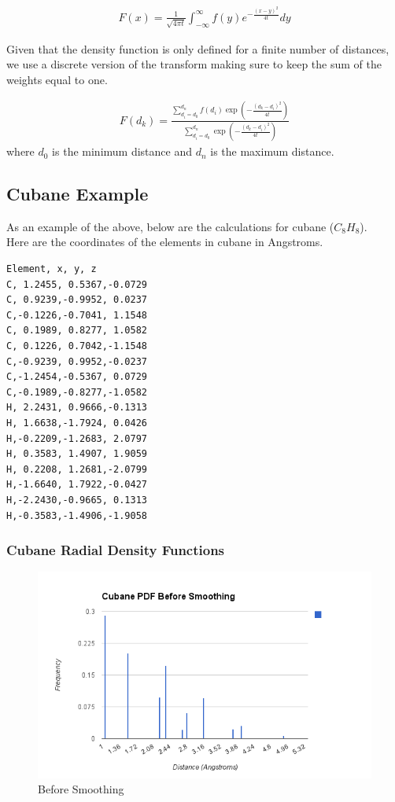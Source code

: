 \documentclass[12pt,letterpaper]{article}
\begin{document}
\begin{align*}
F(x)=\frac{1}{\sqrt{4\pi t}} 
  \int_{-\infty}^\infty f(y) e^{-\frac{(x-y)^2}{4t}} dy
\end{align*}

Given that the density function is only defined for a finite number of
distances, we use a discrete version of the transform making sure to keep the
sum of the weights equal to one.

\begin{align*}
  F(d_k) = \frac{\sum_{d_i = d_0}^{d_n} f(d_i) \exp\left(-\frac{(d_k -
                  d_i)^2}{4t}\right)}
            {\sum_{d_i = d_0}^{d_n} \exp\left(-\frac{(d_k - d_i)^2}{4t}\right)}
\end{align*}
where $d_0$ is the minimum distance and $d_n$ is the maximum distance.

\subsection{Cubane Example}
As an example of the above, below are the calculations for cubane ($C_8 H_8$).\\

\noindent Here are the coordinates of the elements in cubane in Angstroms.

\begin{verbatim}
Element, x, y, z
C, 1.2455, 0.5367,-0.0729
C, 0.9239,-0.9952, 0.0237
C,-0.1226,-0.7041, 1.1548
C, 0.1989, 0.8277, 1.0582
C, 0.1226, 0.7042,-1.1548
C,-0.9239, 0.9952,-0.0237
C,-1.2454,-0.5367, 0.0729
C,-0.1989,-0.8277,-1.0582
H, 2.2431, 0.9666,-0.1313
H, 1.6638,-1.7924, 0.0426
H,-0.2209,-1.2683, 2.0797
H, 0.3583, 1.4907, 1.9059
H, 0.2208, 1.2681,-2.0799
H,-1.6640, 1.7922,-0.0427
H,-2.2430,-0.9665, 0.1313
H,-0.3583,-1.4906,-1.9058
\end{verbatim}

\subsubsection{Cubane Radial Density Functions}
\begin{figure}[ht!]
  \begin{center}
    \includegraphics[scale=0.7]{figs/cubane_rdf_before_smoothing.png}
    \caption{Before Smoothing}
  \end{center}
\end{figure}
\end{document}
